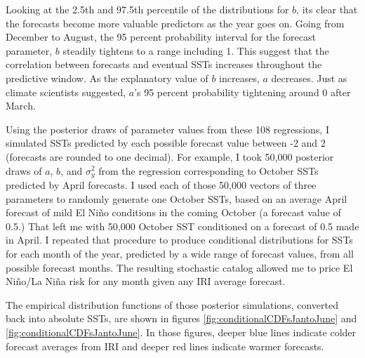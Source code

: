 \documentclass[authoryear]{article}
\begin{document}


Looking at the 2.5th and 97.5th percentile of the distributions for $b$, its clear that the forecasts become more valuable predictors as the year goes on. Going from December to August, the 95 percent probability interval for the forecast parameter, $b$ steadily tightens to a range including 1. This suggest that the correlation between forecasts and eventual SSTs increases throughout the predictive window. As the explanatory value of $b$ increases, $a$ decreases. Just as climate scientists suggested, $a$'s 95 percent probability tightening around 0 after March.

Using the posterior draws of parameter values from these 108 regressions, I simulated SSTs predicted by each possible forecast value between -2 and 2 (forecasts are rounded to one decimal). For example, I took 50,000 posterior draws of $a$, $b$, and $\sigma_{y}^2$ from the regression corresponding to October SSTs predicted by April forecasts. I used each of those 50,000 vectors of three parameters to randomly generate one October SSTs, based on an average April forecast of mild El Ni\~no conditions in the coming October (a forecast value of 0.5.) That left me with 50,000 October SST conditioned on a forecast of 0.5 made in April. I repeated that procedure to produce conditional distributions for SSTs for each month of the year, predicted by a wide range of forecast values, from all possible forecast months. The resulting stochastic catalog allowed me to price El Ni\~no/La Ni\~na risk for any month given any IRI average forecast. 

The empirical distribution functions of those posterior simulations, converted back into absolute SSTs, are shown in figures \ref{fig:conditionalCDFsJantoJune} and \ref{fig:conditionalCDFsJantoJune}. In those figures, deeper blue lines indicate colder forecast averages from IRI and deeper red lines indicate warmer forecasts.
 
\end{document}

